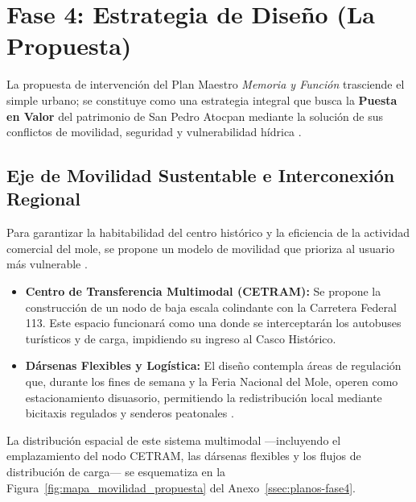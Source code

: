 \section{Fase 4: Estrategia de Diseño (La Propuesta)}
\label{sec:estrategia-diseño}

La propuesta de intervención del Plan Maestro \textit{Memoria y Función} trasciende 
el simple  urbano; se constituye como una estrategia integral que 
busca la \textbf{Puesta en Valor} del patrimonio de San Pedro Atocpan mediante 
la solución de sus conflictos de movilidad, seguridad y vulnerabilidad hídrica 
\cite{icomos1964venecia}.

\subsection{Eje de Movilidad Sustentable e Interconexión Regional}
\label{ssec:movilidad-interconexion}

Para garantizar la habitabilidad del centro histórico y la eficiencia de la actividad 
comercial del mole, se propone un modelo de movilidad que prioriza al usuario más 
vulnerable \cite{milpaalta2017pddu}.

\begin{itemize}
    \item \textbf{Centro de Transferencia Multimodal (CETRAM):} Se propone la 
            construcción de un nodo de baja escala colindante con la Carretera Federal 113. 
            Este espacio funcionará como una  donde 
            se interceptarán los autobuses turísticos y de carga, impidiendo su ingreso al 
            Casco Histórico.
    \item \textbf{Dársenas Flexibles y Logística:} El diseño contempla áreas de
            regulación que, durante los fines de semana y la Feria Nacional del Mole,
            operen como estacionamiento disuasorio, permitiendo la redistribución local
            mediante bicitaxis regulados y senderos peatonales \cite{ramirez2017gestion}.
\end{itemize}

La distribución espacial de este sistema multimodal —incluyendo el emplazamiento del
nodo CETRAM, las dársenas flexibles y los flujos de distribución de carga— se
esquematiza en la Figura~\ref{fig:mapa_movilidad_propuesta} del
Anexo~\ref{ssec:planos-fase4}.

